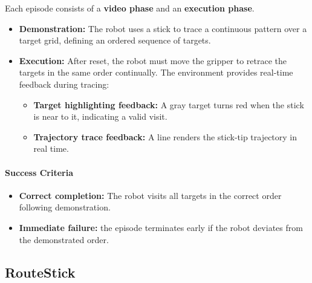 Each episode consists of a \textbf{video phase} and an \textbf{execution phase}.

\begin{itemize}[itemsep=1pt, topsep=0pt, leftmargin=*]

\item \textbf{Demonstration:} The robot uses a stick to trace a continuous pattern over a target grid, defining an ordered sequence of targets.

\item \textbf{Execution:} After reset, the robot must move the gripper to retrace the targets in the same order continually. The environment provides real-time feedback during tracing:
\begin{itemize}[itemsep=1pt, topsep=0pt, leftmargin=*]
    \item \textbf{Target highlighting feedback:} A gray target turns red when the stick is near to it, indicating a valid visit.
    \item \textbf{Trajectory trace feedback:} A line renders the stick-tip trajectory in real time.

\end{itemize}


\end{itemize}

\paragraph{Success Criteria}

\begin{itemize}[itemsep=1pt, topsep=0pt, leftmargin=*]

\item \textbf{Correct completion:} The robot visits all targets in the correct order following demonstration.

\item \textbf{Immediate failure:} the episode terminates early if the robot deviates from the demonstrated order.

\end{itemize}


\clearpage


\subsection{RouteStick}
\label{sec:task_routestick}

